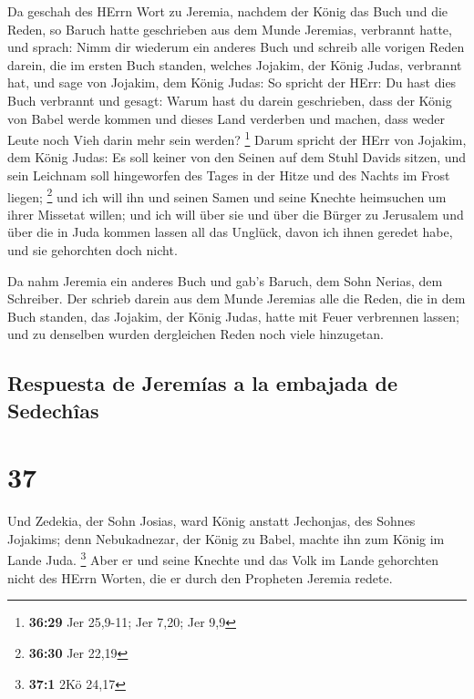  Da geschah des HErrn Wort zu Jeremia, nachdem der König
das Buch und die Reden, so Baruch hatte geschrieben aus dem Munde
Jeremias, verbrannt hatte, und sprach:  Nimm dir wiederum
ein anderes Buch und schreib alle vorigen Reden darein, die im ersten
Buch standen, welches Jojakim, der König Judas, verbrannt hat,
 und sage von Jojakim, dem König Judas: So spricht der
HErr: Du hast dies Buch verbrannt und gesagt: Warum hast du darein
geschrieben, dass der König von Babel werde kommen und dieses Land
verderben und machen, dass weder Leute noch Vieh darin mehr sein werden?
\footnote{\textbf{36:29} Jer 25,9-11; Jer 7,20; Jer 9,9} 
Darum spricht der HErr von Jojakim, dem König Judas: Es soll keiner von
den Seinen auf dem Stuhl Davids sitzen, und sein Leichnam soll
hingeworfen des Tages in der Hitze und des Nachts im Frost liegen;
\footnote{\textbf{36:30} Jer 22,19}  und ich will ihn und
seinen Samen und seine Knechte heimsuchen um ihrer Missetat willen; und
ich will über sie und über die Bürger zu Jerusalem und über die in Juda
kommen lassen all das Unglück, davon ich ihnen geredet habe, und sie
gehorchten doch nicht.

 Da nahm Jeremia ein anderes Buch und gab's Baruch, dem
Sohn Nerias, dem Schreiber. Der schrieb darein aus dem Munde Jeremias
alle die Reden, die in dem Buch standen, das Jojakim, der König Judas,
hatte mit Feuer verbrennen lassen; und zu denselben wurden dergleichen
Reden noch viele hinzugetan.

\hypertarget{respuesta-de-jeremuxedas-a-la-embajada-de-sedechuxeeas}{%
\subsection{Respuesta de Jeremías a la embajada de
Sedechîas}\label{respuesta-de-jeremuxedas-a-la-embajada-de-sedechuxeeas}}

\hypertarget{section-36}{%
\section{37}\label{section-36}}

 Und Zedekia, der Sohn Josias, ward König anstatt
Jechonjas, des Sohnes Jojakims; denn Nebukadnezar, der König zu Babel,
machte ihn zum König im Lande Juda. \footnote{\textbf{37:1} 2Kö 24,17}
 Aber er und seine Knechte und das Volk im Lande
gehorchten nicht des HErrn Worten, die er durch den Propheten Jeremia
redete.

